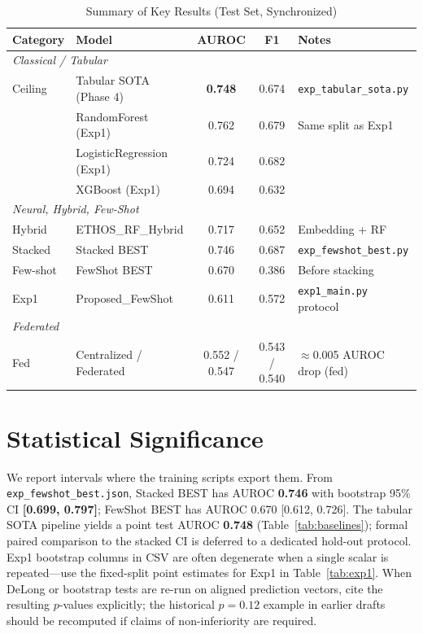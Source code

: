 \begin{table}[htbp]
\centering
\caption{Summary of Key Results (Test Set, Synchronized)}
\small
\begin{tabular}{llccp{3.6cm}}
\toprule
Category & Model & AUROC & F1 & Notes \\
\midrule
\multicolumn{5}{l}{\textit{Classical / Tabular}} \\
Ceiling & Tabular SOTA (Phase 4) & \textbf{0.748} & 0.674 & \texttt{exp\_tabular\_sota.py} \\
 & RandomForest (Exp1) & 0.762 & 0.679 & Same split as Exp1 \\
 & LogisticRegression (Exp1) & 0.724 & 0.682 & \\
 & XGBoost (Exp1) & 0.694 & 0.632 & \\
\midrule
\multicolumn{5}{l}{\textit{Neural, Hybrid, Few-Shot}} \\
Hybrid & ETHOS\_RF\_Hybrid & 0.717 & 0.652 & Embedding + RF \\
Stacked & Stacked BEST & 0.746 & 0.687 & \texttt{exp\_fewshot\_best.py} \\
Few-shot & FewShot BEST & 0.670 & 0.386 & Before stacking \\
Exp1 & Proposed\_FewShot & 0.611 & 0.572 & \texttt{exp1\_main.py} protocol \\
\midrule
\multicolumn{5}{l}{\textit{Federated}} \\
Fed & Centralized / Federated & 0.552 / 0.547 & 0.543 / 0.540 & $\approx$0.005 AUROC drop (fed) \\
\bottomrule
\end{tabular}
\label{tab:summary_key_results}
\end{table}

\section{Statistical Significance}

We report intervals where the training scripts export them. From \texttt{exp\_fewshot\_best.json}, Stacked BEST has AUROC \textbf{0.746} with bootstrap 95\% CI \textbf{[0.699, 0.797]}; FewShot BEST has AUROC 0.670 [0.612, 0.726]. The tabular SOTA pipeline yields a point test AUROC \textbf{0.748} (Table~\ref{tab:baselines}); formal paired comparison to the stacked CI is deferred to a dedicated hold-out protocol. Exp1 bootstrap columns in CSV are often degenerate when a single scalar is repeated---use the fixed-split point estimates for Exp1 in Table~\ref{tab:exp1}. When DeLong or bootstrap tests are re-run on aligned prediction vectors, cite the resulting $p$-values explicitly; the historical $p=0.12$ example in earlier drafts should be recomputed if claims of non-inferiority are required.

